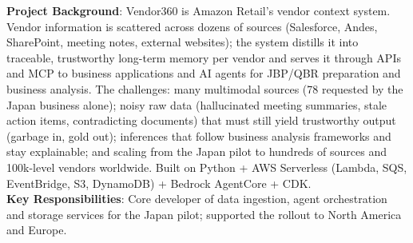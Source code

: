 \documentclass{resume}
\begin{document}

\textbf{Project Background}: Vendor360 is Amazon Retail's vendor context system. Vendor information is scattered across dozens of sources (Salesforce, Andes, SharePoint, meeting notes, external websites); the system distills it into traceable, trustworthy long-term memory per vendor and serves it through APIs and MCP to business applications and AI agents for JBP/QBR preparation and business analysis. The challenges: many multimodal sources (78 requested by the Japan business alone); noisy raw data (hallucinated meeting summaries, stale action items, contradicting documents) that must still yield trustworthy output (garbage in, gold out); inferences that follow business analysis frameworks and stay explainable; and scaling from the Japan pilot to hundreds of sources and 100k-level vendors worldwide. Built on Python + AWS Serverless (Lambda, SQS, EventBridge, S3, DynamoDB) + Bedrock AgentCore + CDK.\\

\textbf{Key Responsibilities}: Core developer of data ingestion, agent orchestration and storage services for the Japan pilot; supported the rollout to North America and Europe.\\
\end{document}
